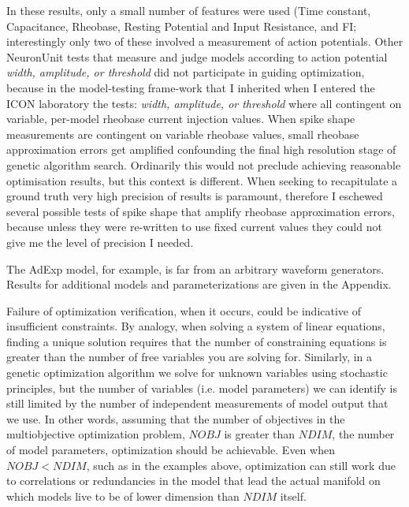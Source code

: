 In these results, only a small number of features were used (Time constant, Capacitance, Rheobase, Resting Potential and Input Resistance, and FI; interestingly only two of these involved a measurement of action potentials.
Other NeuronUnit tests that measure and judge models according to action potential \emph{width, amplitude, or threshold} did not participate in guiding optimization, because in the model-testing frame-work that I inherited when I entered the ICON laboratory the tests: \emph{width, amplitude, or threshold} where all contingent on variable, per-model rheobase current injection values.
When spike shape measurements are contingent on variable rheobase values, small rheobase approximation errors get amplified confounding the final high resolution stage of genetic algorithm search. Ordinarily this would not preclude achieving reasonable optimisation results, but this context is different. When seeking to recapitulate a ground truth very high precision of results is paramount, therefore I eschewed several possible tests of spike shape that amplify rheobase approximation errors, because unless they were re-written to use fixed current values they could not give me the level of precision I needed.


The AdExp model, for example, is far from an arbitrary waveform generators.
Results for additional models and parameterizations are given in the Appendix.

Failure of optimization verification, when it occurs, could be indicative of insufficient constraints.
By analogy, when solving a system of linear equations, finding a unique solution requires that the number of constraining equations is greater than the number of free variables you are solving for.
Similarly, in a genetic optimization algorithm we solve for unknown variables using stochastic principles, but the number of variables (i.e. model parameters) we can identify is still limited by the number of independent measurements of model output that we use.
In other words, assuming that the number of objectives in the multiobjective optimization problem, $NOBJ$ is greater than $NDIM$, the number of model parameters, optimization should be achievable.
Even when $NOBJ<NDIM$, such as in the examples above, optimization can still work due to correlations or redundancies in the model that lead the actual manifold on which models live to be of lower dimension than $NDIM$ itself.

